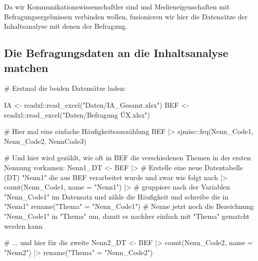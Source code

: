 \documentclass[twoside, pagesize, fontsize=11pt, dvipsnames]{scrreport}
\newenvironment{Shaded}{\begin{snugshade}}{\end{snugshade}}
\newcommand{\AttributeTok}[1]{\textcolor[rgb]{0.40,0.45,0.13}{#1}}
\newcommand{\CommentTok}[1]{\textcolor[rgb]{0.37,0.37,0.37}{#1}}
\newcommand{\FunctionTok}[1]{\textcolor[rgb]{0.28,0.35,0.67}{#1}}
\newcommand{\NormalTok}[1]{\textcolor[rgb]{0.00,0.23,0.31}{#1}}
\newcommand{\OtherTok}[1]{\textcolor[rgb]{0.00,0.23,0.31}{#1}}
\newcommand{\SpecialCharTok}[1]{\textcolor[rgb]{0.37,0.37,0.37}{#1}}
\newcommand{\StringTok}[1]{\textcolor[rgb]{0.13,0.47,0.30}{#1}}
\begin{document}
Da wir Kommunikationswissenschaftler sind und Medieneigenschaften mit
Befragungsergebnissen verbinden wollen, fusionieren wir hier die
Datensätze der Inhaltsanalyse mit denen der Befragung.

\hypertarget{die-befragungsdaten-an-die-inhaltsanalyse-matchen}{%
\subsection{Die Befragungsdaten an die Inhaltsanalyse
matchen}\label{die-befragungsdaten-an-die-inhaltsanalyse-matchen}}

\begin{Shaded}
\begin{Highlighting}[]

\CommentTok{\# Erstmal die beiden Datensätze laden:}

\NormalTok{IA }\OtherTok{\textless{}{-}}\NormalTok{ readxl}\SpecialCharTok{::}\FunctionTok{read\_excel}\NormalTok{(}\StringTok{"Daten/IA\_Gesamt.xlsx"}\NormalTok{)}
\NormalTok{BEF }\OtherTok{\textless{}{-}}\NormalTok{ readxl}\SpecialCharTok{::}\FunctionTok{read\_excel}\NormalTok{(}\StringTok{"Daten/Befragung ÜX.xlsx"}\NormalTok{)}

\CommentTok{\# Hier mal eine einfache Häufigkeitsauszählung}
\NormalTok{BEF }\SpecialCharTok{|\textgreater{}}\NormalTok{ sjmisc}\SpecialCharTok{::}\FunctionTok{frq}\NormalTok{(Nenn\_Code1, Nenn\_Code2, NennCode3)}
  
\CommentTok{\# Und hier wird gezählt, wie oft in BEF die verschiedenen Themen in der ersten Nennung vorkamen:}
\NormalTok{Nenn1\_DT }\OtherTok{\textless{}{-}}\NormalTok{ BEF }\SpecialCharTok{|\textgreater{}} \CommentTok{\# Erstelle eine neue Datentabelle (DT) "Nenn1" die aus BEF verarbeitet wurde und zwar wie folgt nach |\textgreater{} }
  \FunctionTok{count}\NormalTok{(Nenn\_Code1, }\AttributeTok{name =} \StringTok{"Nenn1"}\NormalTok{) }\SpecialCharTok{|\textgreater{}} \CommentTok{\# gruppiere nach der Variablen "Nenn\_Code1" im Datensatz und zähle die Häufigkeit und schreibe die in "Nenn1"}
  \FunctionTok{rename}\NormalTok{(}\StringTok{"Thema"} \OtherTok{=} \StringTok{"Nenn\_Code1"}\NormalTok{) }\CommentTok{\# Nenne jetzt noch die Bezeichnung "Nenn\_Code1" in "Thema" um, damit es nachher einfach mit "Thema" gematcht werden kann}

\CommentTok{\# ... und hier für die zweite}
\NormalTok{Nenn2\_DT }\OtherTok{\textless{}{-}}\NormalTok{ BEF }\SpecialCharTok{|\textgreater{}} 
  \FunctionTok{count}\NormalTok{(Nenn\_Code2, }\AttributeTok{name =} \StringTok{"Nenn2"}\NormalTok{) }\SpecialCharTok{|\textgreater{}} 
  \FunctionTok{rename}\NormalTok{(}\StringTok{"Thema"} \OtherTok{=} \StringTok{"Nenn\_Code2"}\NormalTok{)}


\end{Highlighting}
\end{Shaded}
\end{document}
